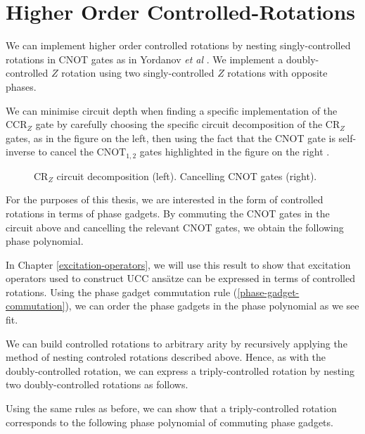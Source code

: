 \section{Higher Order Controlled-Rotations}

We can implement higher order controlled rotations by nesting singly-controlled rotations in CNOT gates as in Yordanov \textit{et al} \cite{Yordanov2020}. We implement a doubly-controlled $Z$ rotation using two singly-controlled $Z$ rotations with opposite phases.


We can minimise circuit depth when finding a specific implementation of the CCR$_Z$ gate by carefully choosing the specific circuit decomposition of the CR$_Z$ gates, as in the figure on the left, then using the fact that the CNOT gate is self-inverse to cancel the $\text{CNOT}_{1, 2}$ gates highlighted in the figure on the right \cite{Yordanov2020}.

\begin{figure}[H]
    \centering
    \caption{CR$_Z$ circuit decomposition (left). Cancelling CNOT gates (right).}
\end{figure}

For the purposes of this thesis, we are interested in the form of controlled rotations in terms of phase gadgets. By commuting the CNOT gates in the circuit above and cancelling the relevant CNOT gates, we obtain the following phase polynomial.


In Chapter \ref{excitation-operators}, we will use this result to show that excitation operators used to construct UCC ansätze can be expressed in terms of controlled rotations. Using the phase gadget commutation rule (\ref{phase-gadget-commutation}), we can order the phase gadgets in the phase polynomial as we see fit.

We can build controlled rotations to arbitrary arity by recursively applying the method of nesting controled rotations described above. Hence, as with the doubly-controlled rotation, we can express a triply-controlled rotation by nesting two doubly-controlled rotations as follows.


Using the same rules as before, we can show that a triply-controlled rotation corresponds to the following phase polynomial of commuting phase gadgets.

